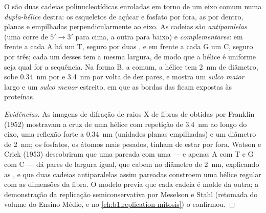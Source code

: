 \begin{theorem}\label{thm:b1:nucleic-acids:helix}
O  são duas cadeias polinucleotídicas enroladas em torno de um eixo
comum numa \emph{dupla-hélice} destra: os esqueletos de açúcar e fosfato
por fora, as  por dentro, planas e empilhadas perpendicularmente ao
eixo. As cadeias são \emph{antiparalelas} (uma corre de $5' \to 3'$ para
cima, a outra para baixo) e \emph{complementares}: em frente a cada A
há um T, seguro por duas , e em frente a cada G um
C, seguro por três; cada um desses \emph{} tem a mesma
largura, de modo que a hélice é uniforme seja qual for a sequência. Na
forma B, a comum, a hélice tem \qty{2}{nm} de diâmetro, sobe
\qty{0.34}{nm} por  e \qty{3.4}{nm} por volta de dez pares,
e mostra um \emph{sulco maior} largo e um \emph{sulco menor} estreito,
em que as bordas das  ficam expostas às proteínas.
\end{theorem}
\begin{proof}[Evidências]
As imagens de difração de raios X de fibras de  obtidas por Franklin
(1952) mostravam a cruz de uma hélice com repetição de \qty{3.4}{nm} ao
longo do eixo, uma reflexão forte a \qty{0.34}{nm} (unidades planas
empilhadas) e um diâmetro de \qty{2}{nm}; os fosfatos, os átomos mais
pesados, tinham de estar por fora. Watson e Crick (1953) descobriram
que uma  pareada com uma  --- e apenas A com T e G com C
--- dá pares de largura igual, que cabem no diâmetro de \qty{2}{nm},
explicando as , e que duas cadeias antiparalelas assim
pareadas constroem uma hélice regular com as dimensões da fibra. O
modelo previa que cada cadeia é molde da outra; a demonstração da
replicação semiconservativa por Meselson e Stahl (retomada do volume do
Ensino Médio, e no \cref{ch:b1:replication-mitosis}) o confirmou.
\end{proof}

